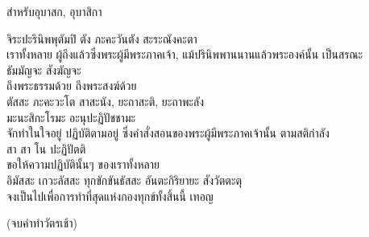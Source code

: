 \documentclass{article}
\begin{document}
\begin{center}สำหรับอุบาสก, อุบาสิกา\end{center}
จิระปะรินิพพุตัมปิ ตัง ภะคะวันตัง สะระณังคะตา\\
\indent เราทั้งหลาย ผู้ถึงแล้วซึ่งพระผู้มีพระภาคเจ้า,
แม้ปรินิพพานนานแล้วพระองค์นั้น เป็นสรณะ\\
ธัมมัญจะ สังฆัญจะ\\
\indent ถึงพระธรรมด้วย ถึงพระสงฆ์ด้วย\\
ตัสสะ ภะคะวะโต สาสะนัง, ยะถาสะติ, ยะถาพะลัง\\
มะนะสิกะโรมะ อะนุปะฏิปัชชามะ\\
\indent จักทำในใจอยู่ ปฏิบัติตามอยู่ ซึ่งคำสั่งสอนของพระผู้มีพระภาคเจ้านั้น
ตามสติกำลัง\\
สา สา โน ปะฏิปัตติ\\
\indent ขอให้ความปฏิบัตินั้นๆ ของเราทั้งหลาย\\
อิมัสสะ เกวะลัสสะ ทุกขักขันธัสสะ อันตะกิริยายะ สังวัตตะตุ\\
\indent จงเป็นไปเพื่อการทำที่สุดแห่งกองทุกข์ทั้งสิ้นนี้ เทอญ\\
\begin{center}
(จบคำทำวัตรเช้า)
\end{center}
\pagebreak
\end{document}
